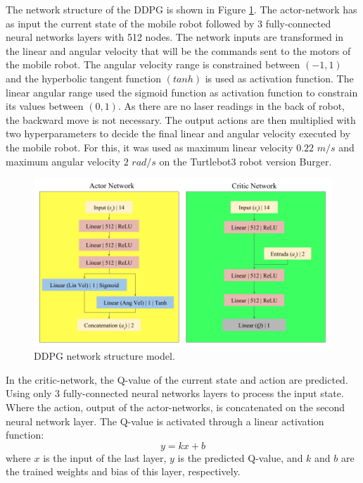 The network structure of the DDPG is shown in {\color{blue}Figure} \ref{fig:projetointegrador}. 
The actor-network has as input the current state of the mobile robot followed by 3 fully-connected neural networks layers with 512 nodes.
The network inputs are transformed in the linear and angular velocity that will be the commands sent to the motors of the mobile robot. 
The angular velocity range is constrained between $(-1,1)$ and the hyperbolic tangent function $(tanh)$ is used as activation function.
The linear angular range used the sigmoid function as activation function to constrain its values between $(0,1)$.
As there are no laser readings in the back of robot, the backward move is not necessary.
The output actions are then multiplied with two hyperparameters to decide the final linear and angular velocity executed by the mobile robot.
For this, it was used as maximum linear velocity $0.22$ $m/s$ and maximum angular velocity $2$ $rad/s$ on the Turtlebot3 robot version Burger.


\begin{figure}[H]
\centerline{\includegraphics[width=12cm]{images/projeto_integrador_en.png}}
\caption{DDPG network structure model.}
\label{fig:projetointegrador}
\end{figure}

In the critic-network, the Q-value of the current state and action are predicted.
Using only 3 fully-connected neural networks layers to process the input state.
Where the action, output of the actor-networks, is concatenated on the second neural network layer.
The Q-value is activated through a linear activation function:
\begin{equation}
y = kx +b
\end{equation}
where $x$ is the input of the last layer, $y$ is the predicted Q-value, and $k$ and $b$ are the trained weights and bias of this layer, respectively.

